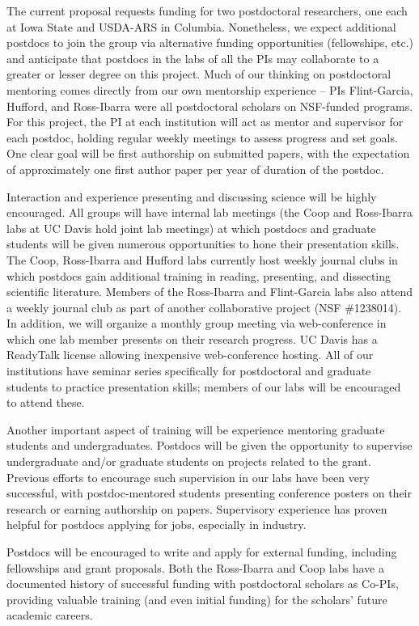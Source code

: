 The current proposal requests funding for two postdoctoral researchers, one each at Iowa State and USDA-ARS in Columbia. Nonetheless, we expect additional postdocs to join the group via alternative funding opportunities (fellowships, etc.) and anticipate that postdocs in the labs of all the PIs may collaborate to a greater or lesser degree on this project.  Much of our thinking on postdoctoral mentoring comes directly from our own mentorship experience -- PIs Flint-Garcia, Hufford, and Ross-Ibarra were all postdoctoral scholars on NSF-funded programs. For this project, the PI at each institution will act as mentor and supervisor for each postdoc, holding regular weekly meetings to assess progress and set goals.  One clear goal will be first authorship on submitted papers, with the expectation of approximately one first author paper per year of duration of the postdoc. 

Interaction and experience presenting and discussing science will be highly encouraged. All groups will have internal lab meetings (the Coop and Ross-Ibarra labs at UC Davis hold joint lab meetings) at which postdocs and graduate students will be given numerous opportunities to hone their presentation skills.  The Coop, Ross-Ibarra and Hufford labs currently host weekly journal clubs in which postdocs gain additional training in reading, presenting, and dissecting scientific literature. Members of the Ross-Ibarra and Flint-Garcia labs also attend a weekly journal club as part of another collaborative project (NSF \#1238014). In addition, we will organize a monthly group meeting via web-conference in which one lab member presents on their research progress.  UC Davis has a ReadyTalk license allowing inexpensive web-conference hosting. All of our institutions have seminar series specifically for postdoctoral and graduate students to practice presentation skills; members of our labs will be encouraged to attend these.

Another important aspect of training will be experience mentoring graduate students and undergraduates.  Postdocs will be given the opportunity to supervise undergraduate and/or graduate students on projects related to the grant.  Previous efforts to encourage such supervision in our labs have been very successful, with postdoc-mentored students presenting conference posters on their research or earning authorship on papers.  Supervisory experience has proven helpful for postdocs applying for jobs, especially in industry.

Postdocs will be encouraged to write and apply for external funding, including fellowships and grant proposals.  Both the Ross-Ibarra and Coop labs have a documented history of successful funding with postdoctoral scholars as Co-PIs, providing valuable training (and even initial funding) for the scholars' future academic careers.

